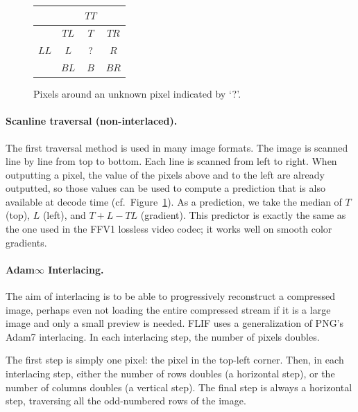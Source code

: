 \documentclass{article}
\begin{document}
\begin{figure}
\begin{center}
\begin{tabular}{|c|c|c|c|}
\hline
     &      & \boldmath $TT$ & \\
\hline
     & \boldmath $TL$ & \boldmath $T$ & \boldmath $TR$ \\
\hline
\boldmath $LL$ & \boldmath $L$ &   ?  &  $R$\\
\hline
     & \boldmath $BL$ &  $B$ & \boldmath $BR$ \\
\hline
\end{tabular}
\end{center}
\caption{Pixels around an unknown pixel indicated by `?'.}
\label{pixels}
\end{figure}


\paragraph{Scanline traversal (non-interlaced).}
\label{sec:simple_traversal}
The first traversal method is used in many image formats.
The image is scanned line by line from top to bottom. Each line is scanned from left to right.
When outputting a pixel, the value of the pixels above and to the left are already outputted,
so those values can be used to compute a prediction that is also available at decode time (cf.\ Figure~\ref{pixels}).
%
As a prediction, we take the median of %
$T$ (top), $L$ (left), and $T+L-TL$ (gradient).
This predictor is exactly the same as the one used in the FFV1 lossless video codec;
it works well on smooth color gradients.



\paragraph{Adam$\infty$ Interlacing.}
\label{sec:interlacing}
The aim of interlacing is to be able to progressively reconstruct a compressed image, perhaps even
not loading the entire compressed stream if it is a large image and only a small preview is needed.
FLIF uses a generalization of PNG's Adam7 interlacing. In each interlacing step, the number of pixels
doubles.

The first step is simply one pixel: the pixel in the top-left corner.
Then, in each interlacing step, either the number of rows doubles (a horizontal step),
or the number of columns doubles (a vertical step). The final step is always a horizontal step, traversing all the
odd-numbered rows of the image.
\end{document}
